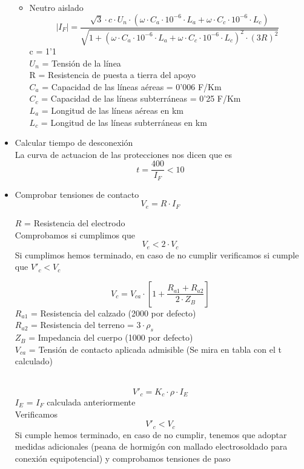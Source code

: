 \documentclass[10pt,a4paper]{article}
\begin{document}
\begin{itemize}
\begin{itemize}
                \item Neutro aislado
                $$
                \left|I_{F}\right|=\frac{\sqrt{3} \cdot c \cdot U_{n} \cdot\left(\omega \cdot C_{a}\cdot 10^{-6} \cdot L_{a}+\omega \cdot C_{c}\cdot 10^{-6} \cdot L_{c}\right)}{\sqrt{1+\left(\omega \cdot C_{a}\cdot 10^{-6} \cdot L_{a}+\omega \cdot C_{c}\cdot 10^{-6} \cdot L_{c}\right)^{2} \cdot(3 R)^{2}}}
                $$
                c = 1'1 \\
                $U_n$ = Tensión de la línea \\
                R = Resistencia de puesta a tierra del apoyo \\
                $C_a$ = Capacidad de las líneas aéreas = 0'006 \mu F/Km \\
                $C_c$ = Capacidad de las líneas subterráneas = 0'25 \mu  F/Km \\
                $L_a$ = Longitud de las líneas aéreas en km \\
                $L_c$ = Longitud de las líneas subterráneas en km
            \end{itemize}   
    \item Calcular tiempo de desconexión
    \\
    
    La curva de actuacion de las protecciones nos dicen que es
    $$t = \frac{400}{I_F} < 10$$
    \item Comprobar tensiones de contacto 
    $$V_e = R \cdot I_F$$
    
    $R$ = Resistencia del electrodo
    \\
    
    Comprobamos si cumplimos que
    $$V_e < 2 \cdot V_c$$
    Si cumplimos hemos terminado, en caso de no cumplir verificamos si cumple que  $
    V'_c < V_c
    $
    
    $$V_c = V_{ca} \cdot \left[ 1 + \frac{R_{a1} + R_{a2}}{2 \cdot Z_B} \right]$$
    $R_{a1}$ = Resistencia del calzado (2000 por defecto) \\
    $R_{a2}$ = Resistencia del terreno = $3 \cdot \rho_s$ \\
    $Z_B$ = Impedancia del cuerpo (1000 por defecto) \\
    $V_{ca}$ = Tensión de contacto aplicada admisible (Se mira en tabla con el t calculado)
    
    \\
    $$V'_c = K_c \cdot \rho \cdot I_E$$
    $I_E$ = $I_F$ calculada anteriormente
    \\
    Verificamos 
     $$
    V'_c < V_c
    $$
    Si cumple hemos terminado, en caso de no cumplir, tenemos que adoptar medidas adicionales (peana de hormigón con mallado electrosoldado para conexión equipotencial) y comprobamos tensiones de paso
    

\end{itemize}
\end{document}
